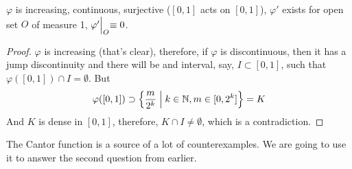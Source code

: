 \begin{proposition}
    $\varphi$ is increasing, continuous, surjective ($[0,1]$ acts on $[0,1]$),
    $\varphi'$ exists for open set $O$ of measure 1,
    $\varphi'\Bigl|_O \equiv 0$.
\end{proposition}
\begin{proof}
    $\varphi$ is increasing (that's clear), therefore, if $\varphi$ is 
    discontinuous, then it has a jump discontinuity and there will be 
    and interval, say, $I \subset [0,1]$, such that 
    $\varphi([0,1]) \cap I = \emptyset$. But 
    \[ 
        \varphi([0, 1]) \supset \Bigl\{ \frac{m}{2^k} \mathrel{\Big|}
         k \in \mathbb{N}, m \in [0, 2^k]\Bigr\} = K
    \]
    And $K$ is dense in $[0, 1]$, therefore, $K \cap I \ne \emptyset$,
    which is a contradiction.
\end{proof}
\begin{remark}
    The Cantor function is a source of a lot of counterexamples.
    We are going to use it to answer the second question from earlier.
\end{remark}

